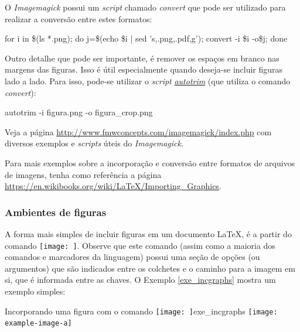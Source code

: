 O \textit{Imagemagick} possui um \textit{script} chamado \textit{convert} que pode ser utilizado para realizar a conversão entre estes formatos:

\begin{commandshell}
for i in \$(ls *.png); do j=\$(echo \$i | sed 's,.png,.pdf,g'); convert -i \$i -o\$j; done
\end{commandshell}

Outro detalhe que pode ser importante, é remover os espaços em branco nas margens das figuras. Isso é útil especialmente quando deseja-se incluir figuras lado a lado. Para isso, pode-se utilizar o \textit{script} \href{http://www.fmwconcepts.com/imagemagick/autotrim/index.php}{\textit{autotrim}} (que utiliza o comando \textit{convert}):

\begin{commandshell}
autotrim -i figura.png -o figura_crop.png
\end{commandshell}

\begin{marker}
Veja a página \url{http://www.fmwconcepts.com/imagemagick/index.php} com diversos exemplos e \textit{scripts} úteis do \textit{Imagemagick}.
\end{marker}

\begin{marker}
  Para mais exemplos sobre a incorporação e conversão entre formatos de arquivos de imagens, tenha como referência a página \url{https://en.wikibooks.org/wiki/LaTeX/Importing_Graphics}.
\end{marker}

\subsubsection*{Ambientes de figuras}
\label{sec:amb_figs}

A forma mais simples de incluir figuras em um documento LaTeX, é a partir do comando \texttt{\texttt{[image: ]}}. Observe que este comando (assim como a maioria dos comandos e marcadores da linguagem) possui uma seção de opções (ou argumentos) que são indicados entre os colchetes e o caminho para a imagem em si, que é informada entre as chaves. O Exemplo \ref{exe_incgraphs} mostra um exemplo simples:

\begin{texexptitled}[breakable,enhanced,middle=2mm]{Incorporando uma figura com o comando \texttt{\texttt{[image: ]}}}{exe_incgraphs}
\texttt{[image: example-image-a]}
\end{texexptitled}

